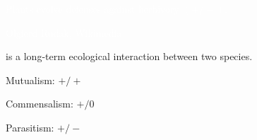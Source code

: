\documentclass[t]{beamer}
\begin{document}
%
{
\begin{frame}{}
\end{frame}
}
%
{
\begin{frame}{}
\end{frame}
}
%
{
\begin{frame}{}
\end{frame}
}
%
{
\begin{frame}{}
\end{frame}
}
%
{
\begin{frame}{}
\end{frame}
}
%
{
\begin{frame}{}
\end{frame}
}
%
{
\begin{frame}{}
\end{frame}
}
%

{
\begin{frame}[b]{\textcolor{white}{Plants evolve defenses against \textcolor{orange4}{herbivory} $(+ / -)$.}}

	\hfill\tiny\textcolor{white}{Olgierd Rudak, Wikimedia }

\end{frame}
}
%
\begin{frame}{ is a long-term ecological interaction between two species.}

	\hangpara Mutualism: $ + / + $ 
	
	\hangpara Commensalism: $ + / 0$
	
	\hangpara Parasitism: $ + / - $ 
		
\end{frame}
\end{document}
